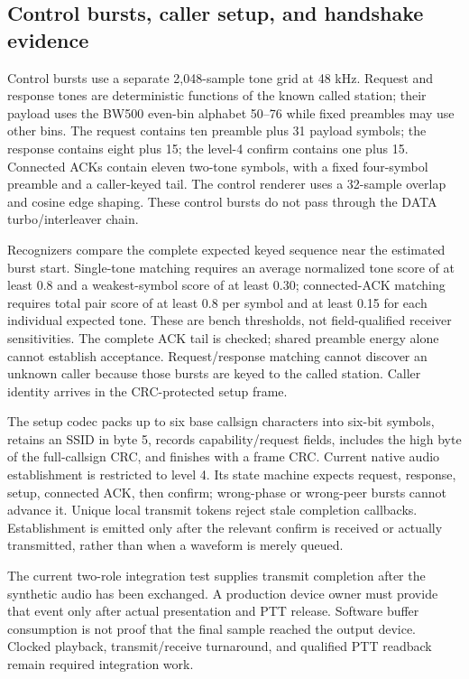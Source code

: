 \subsection{Control bursts, caller setup, and handshake evidence}
Control bursts use a separate 2,048-sample tone grid at 48 kHz. Request and
response tones are deterministic functions of the known called station;
their payload uses the BW500 even-bin alphabet 50--76 while fixed preambles
may use other bins. The request contains ten preamble plus 31 payload symbols;
the response contains eight plus 15; the level-4 confirm contains one plus 15.
Connected ACKs contain eleven two-tone symbols, with a fixed four-symbol
preamble and a caller-keyed tail. The control renderer uses a 32-sample overlap
and cosine edge shaping. These control bursts do not pass through the DATA
turbo/interleaver chain.

Recognizers compare the complete expected keyed sequence near the estimated
burst start. Single-tone matching requires an average normalized tone score
of at least 0.8 and a weakest-symbol score of at least 0.30; connected-ACK
matching requires total pair score of at least 0.8 per symbol and at least
0.15 for each individual expected tone. These are bench thresholds, not
field-qualified receiver sensitivities. The complete ACK tail is checked;
shared preamble energy alone cannot establish acceptance. Request/response
matching cannot discover an unknown caller because those bursts are keyed to
the called station. Caller identity arrives in the CRC-protected setup frame.

The setup codec packs up to six base callsign characters into six-bit symbols,
retains an SSID in byte 5, records capability/request fields, includes the high
byte of the full-callsign CRC, and finishes with a frame CRC. Current native
audio establishment is restricted to level 4. Its state machine expects request,
response, setup, connected ACK, then confirm; wrong-phase or wrong-peer bursts
cannot advance it. Unique local transmit tokens reject stale completion
callbacks. Establishment is emitted only after the relevant confirm is
received or actually transmitted, rather than when a waveform is merely queued.

The current two-role integration test supplies transmit completion after the
synthetic audio has been exchanged. A production device owner must provide
that event only after actual presentation and PTT release. Software buffer
consumption is not proof that the final sample reached the output device.
Clocked playback, transmit/receive turnaround, and qualified PTT readback
remain required integration work.

